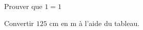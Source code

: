 \begin{exercice}
    \partie
    Prouver que $1=1$

    \partie
    Convertir $125$ cm en m à l'aide du tableau.

\end{exercice}
